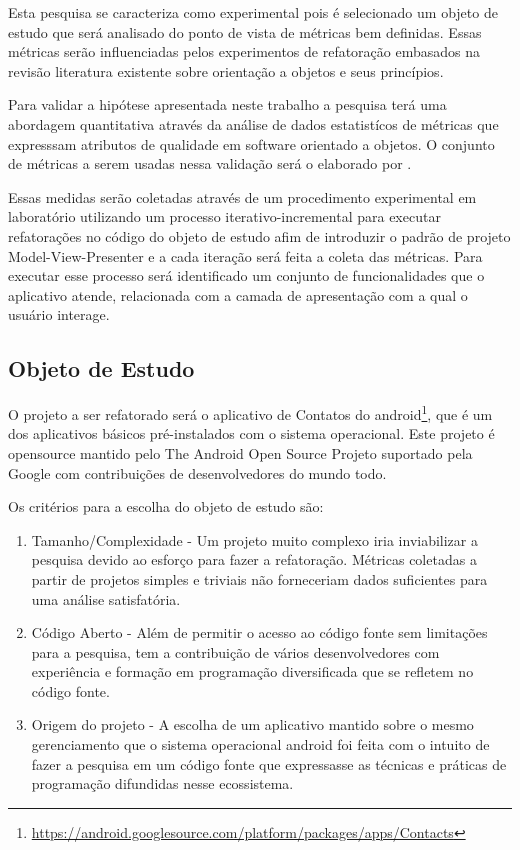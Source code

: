 Esta pesquisa se caracteriza como experimental pois é selecionado um objeto
de estudo que será analisado do ponto de vista de métricas bem definidas. Essas
métricas serão influenciadas pelos experimentos de refatoração embasados na
revisão literatura existente sobre orientação a objetos e seus princípios.

Para validar a hipótese apresentada neste trabalho a pesquisa terá uma
abordagem quantitativa através da análise de dados estatistícos de métricas 
que expresssam atributos de qualidade em software orientado a objetos. O
conjunto de métricas a serem usadas nessa validação será o elaborado por
.

Essas medidas serão coletadas através de um procedimento experimental em
laboratório utilizando um processo iterativo-incremental para executar
refatorações no código do objeto de estudo afim de introduzir o padrão de
projeto Model-View-Presenter e a cada iteração será feita a coleta das
métricas. Para executar esse processo será identificado um conjunto de
funcionalidades que o aplicativo atende, relacionada com a camada de
apresentação com a qual o usuário interage.

\subsection{Objeto de Estudo}


O projeto a ser refatorado será o aplicativo de Contatos do
android\footnote{\url{https://android.googlesource.com/platform/packages/apps/Contacts}},
que é um dos aplicativos básicos pré-instalados com o sistema operacional. Este
projeto é opensource mantido pelo  The Android Open Source Projeto suportado
pela Google com contribuições de desenvolvedores do mundo todo.

Os critérios para a escolha do objeto de estudo são:

\begin{enumerate}
  \item Tamanho/Complexidade - Um projeto muito complexo iria inviabilizar a
  pesquisa devido ao esforço para fazer a refatoração. Métricas coletadas
  a partir de projetos simples e triviais não forneceriam dados suficientes para
  uma análise satisfatória.
  \item Código Aberto - Além de permitir o acesso ao código fonte sem
  limitações para a pesquisa, tem a contribuição de vários desenvolvedores com
  experiência e formação em programação diversificada que se refletem no código fonte.
  \item Origem do projeto - A escolha de um aplicativo mantido sobre o mesmo
  gerenciamento que o sistema operacional android foi feita com o intuito de
  fazer a pesquisa em um código fonte que expressasse as técnicas e práticas de
  programação difundidas nesse ecossistema.
\end{enumerate}

